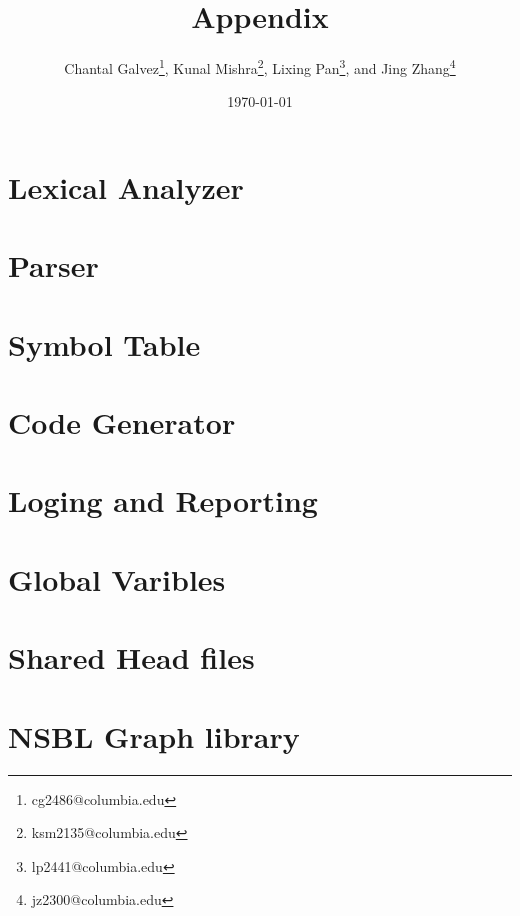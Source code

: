 \documentclass[letterpaper, 10pt]{article}
\title{Appendix}
\author {
Chantal Galvez\footnote{cg2486@columbia.edu},
Kunal Mishra\footnote{ksm2135@columbia.edu},
Lixing Pan\footnote{lp2441@columbia.edu},
and Jing Zhang\footnote{jz2300@columbia.edu}}
\date{\today}
\begin{document}
\maketitle

\tableofcontents
\section{Lexical Analyzer}


\section{Parser}




\section{Symbol Table}





\section{Code Generator}





\section{Loging and Reporting}





\section{Global Varibles}


\section{Shared Head files}




\section{NSBL Graph library}



\end{document}
